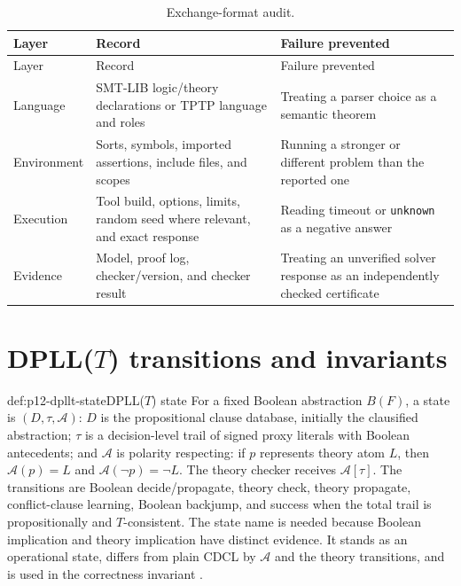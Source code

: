 \begin{longtable}{@{}p{}p{}p{}@{}}
\caption{Exchange-format audit.}
\label{tab:p12-exchange-format-audit}\\
\toprule
Layer & Record & Failure prevented \\ \midrule
\endfirsthead
\toprule
Layer & Record & Failure prevented \\ \midrule
\endhead
Language & SMT-LIB logic/theory declarations or TPTP language and roles &
Treating a parser choice as a semantic theorem \\ \addlinespace
Environment & Sorts, symbols, imported assertions, include files, and scopes &
Running a stronger or different problem than the reported one \\ \addlinespace
Execution & Tool build, options, limits, random seed where relevant, and exact
response & Reading timeout or \texttt{unknown} as a negative answer \\ \addlinespace
Evidence & Model, proof log, checker/version, and checker result & Treating an
unverified solver response as an independently checked certificate \\
\bottomrule
\end{longtable}

\section{DPLL(\(T\)) transitions and invariants}

\begin{hbdefinition}{def:p12-dpllt-state}{DPLL(\(T\)) state}
For a fixed Boolean abstraction \(B(F)\), a state is
\((D,\tau,\mathcal A)\): \(D\) is the propositional clause database, initially
the clausified abstraction; \(\tau\) is a decision-level trail of signed proxy
literals with Boolean antecedents; and \(\mathcal A\) is polarity respecting:
if \(p\) represents theory atom \(L\), then
\(\mathcal A(p)=L\) and \(\mathcal A(\neg p)=\neg L\). The theory checker
receives \(\mathcal A[\tau]\). The transitions are Boolean decide/propagate,
theory check, theory propagate, conflict-clause learning, Boolean backjump,
and success when the total trail is propositionally and \(T\)-consistent.
The state name is needed because Boolean implication and theory implication
have distinct evidence. It stands as an operational state, differs from plain
CDCL by \(\mathcal A\) and the theory transitions, and is used in the
correctness invariant \cite{NieuwenhuisOliverasTinelli2006}.
\end{hbdefinition}

